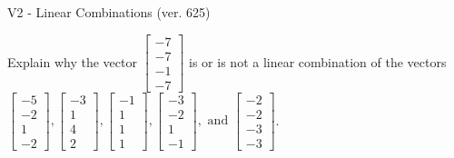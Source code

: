 \begin{exercise}
  \begin{exerciseTitle}V2 - Linear Combinations (ver. 625)\end{exerciseTitle}
  \begin{exerciseStatement}
    Explain why the vector \(\left[\begin{array}{c}
-7 \\
-7 \\
-1 \\
-7
\end{array}\right]\)  is or is not a linear 
	combination of the vectors \(\left[\begin{array}{c}
-5 \\
-2 \\
1 \\
-2
\end{array}\right] , \left[\begin{array}{c}
-3 \\
1 \\
4 \\
2
\end{array}\right] , \left[\begin{array}{c}
-1 \\
1 \\
1 \\
1
\end{array}\right] , \left[\begin{array}{c}
-3 \\
-2 \\
1 \\
-1
\end{array}\right] , \text{ and } \left[\begin{array}{c}
-2 \\
-2 \\
-3 \\
-3
\end{array}\right]\).
	



\end{exerciseStatement}
\end{exercise}
